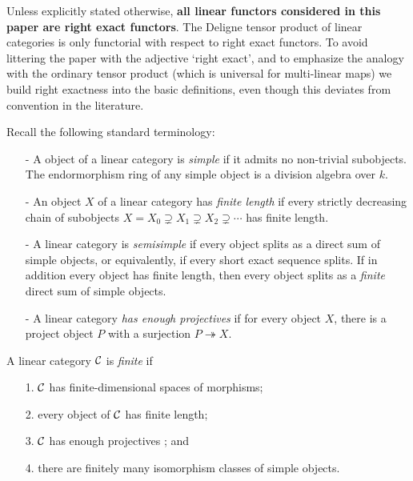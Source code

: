\documentclass{amsart}
\begin{document}
\begin{warning}
	Unless explicitly stated otherwise, {\bfseries all linear functors considered in this paper are  right exact functors}.  The Deligne tensor product of linear categories is only functorial with respect to right exact functors. To avoid littering the paper with the adjective `right exact', and to emphasize the analogy with the ordinary tensor product (which is universal for multi-linear maps) we build right exactness into the basic definitions, even though this deviates from convention in the literature.  
\end{warning}

Recall the following standard terminology:
\begin{itemize}
	\item[-] A object of a linear category is {\em simple} if it admits no non-trivial subobjects. The endormorphism ring of any simple object is a division algebra over $k$. 
	\item[-] An object $X$ of a linear category has {\em finite length} if every strictly decreasing chain of subobjects $X = X_0 \supsetneq X_1 \supsetneq X_2 \supsetneq  \cdots$ has finite length. 
	\item[-] A linear category is {\em semisimple} if every object splits as a direct sum of simple objects, or equivalently, if every short exact sequence splits. If in addition every object has finite length, then every object splits as a {\em finite} direct sum of simple objects.
	\item[-] A linear category {\em has enough projectives} if for every object $X$, there is a project object $P$ with a surjection $P \twoheadrightarrow X$. 
\end{itemize}


\begin{definition} %
	A linear category $\mathcal C$ is {\em finite} if 
	\begin{enumerate}
		\item[1.] $\mathcal C$ has finite-dimensional spaces of morphisms;
		\item[2.] every object of $\mathcal C$ has finite length;
		\item[3.] $\mathcal C$ has enough projectives%
		; and
		\item[4.] there are finitely many isomorphism classes of simple objects.  
	\end{enumerate}
\end{definition}
\end{document}
